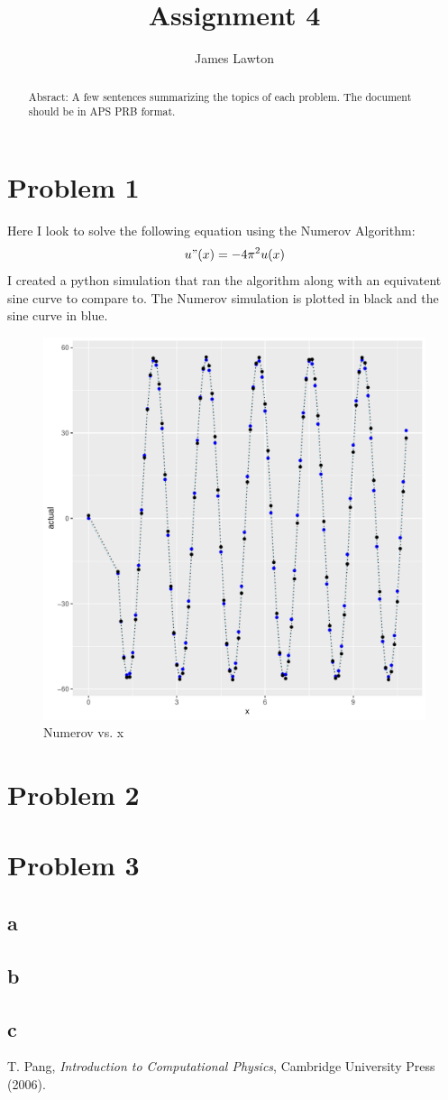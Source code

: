 \documentclass[prb,twocolumn]{revtex4-2}
\begin{document}
\title{Assignment 4}

\author{James Lawton}


\begin{abstract}
Absract: A few sentences summarizing the topics of each problem.  The document should be in APS PRB format.  
\end{abstract}

\maketitle

\section{Problem 1}

\noindent

Here I look to solve the following equation using the Numerov Algorithm:
$$ u"(x)=-4\pi^2u(x)$$
I created a python simulation that ran the algorithm along with an equivatent sine curve to compare to. The Numerov simulation is plotted in black and the sine curve in blue.

\begin{figure}[h!]
\centerline{\includegraphics [width=3 in] {q1}} \caption{Numerov vs. x} \label{q1}
\end{figure}

\section{Problem 2}
\section{Problem 3}
\subsection{a}
\subsection{b}
\subsection{c}

\begin{thebibliography}{99}

 T. Pang, \emph{Introduction to Computational Physics}, Cambridge University Press (2006).

\end{thebibliography}
\end{document}
